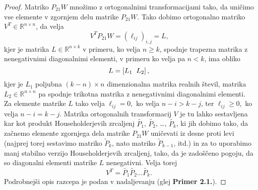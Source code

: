 \documentclass[mat1]{article}
\theoremstyle{definition}
\begin{document}
\begin{proof}
Matriko $P_{21} W$ množimo z ortogonalnimi transformacijami tako, da uničimo vse elemente v zgornjem delu matrike $P_{21} W$. Tako dobimo ortogonalno matriko $V^T \in \mathbb{R}^{n \times n}$, da velja 
$$ V^T P_{21} W = (\ell_{ij})_{i, j} = L
\text{,}$$
kjer je matrika $L \in \mathbb{R}^{n \times k}$ v primeru, ko velja $n \geq k$, spodnje trapezna matrika z nenegativnimi diagonalnimi elementi, v primeru ko velja pa $n < k$, ima obliko 
$$ L =
\left[ L_1 \hspace{2mm} L_2 \right]
\text{,} $$ kjer je $L_1$ poljubna $(k-n) \times n$ dimenzionalna matrika realnih števil, matrika $L_2 \in \mathbb{R}^{n \times n}$ pa spodnje trikotna matrika z nenegativnimi diagonalnimi elementi.
Za elemente matrike $L$ tako velja $\ell_{ij} = 0,$ ko velja $n-i > k-j$, ter $\ell_{ij} \geq 0,$ ko velja $n-i = k-j$.
Matrika ortogonalnih transformacij $V$ je tu lahko sestavljena kar kot produkt Householderjevih zrcaljenj $\tilde{P_1}$, $\tilde{P_2}$, \ldots, $\tilde{P_k}$, ki jih dobimo tako, da začnemo elemente zgornjega dela matrike $P_{21} W$ uničevati iz desne proti levi (najprej torej sestavimo matriko $\tilde{P}_k$, nato matriko $\tilde{P}_{k-1}$, itd.) in za to uporabimo manj stabilno verzijo Householderjevih zrcaljenj, tako, da je zadoščeno pogoju, da so diagonalni elementi matrike $L$ nenegativni.
Velja torej $$V^T = \tilde{P_1} \tilde{P_2} \dots \tilde{P_k} \text{.}$$
Podrobnejši opis razcepa je podan v nadaljevanju (glej \textbf{Primer 2.1.}).


\end{proof}
\end{document}
